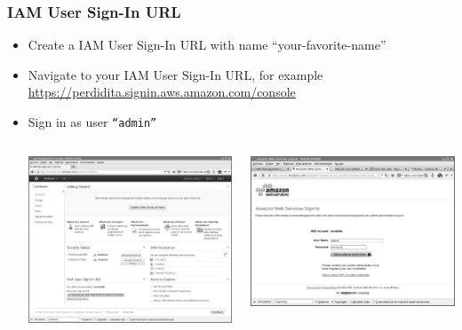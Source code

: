 \documentclass{beamer}
\begin{document}
\begin{frame}[fragile]
\frametitle{IAM User Sign-In URL}
\begin{itemize}
\item Create a IAM User Sign-In URL with name ``your-favorite-name''
\item Navigate to your IAM User Sign-In URL, for example \url{https://perdidita.signin.aws.amazon.com/console}
\item Sign in as user \texttt{``admin''}
\begin{columns}
\begin{center}
\includegraphics[scale=0.10]{siginurl.eps}
\end{center}
\begin{center}
\includegraphics[scale=0.10]{siginurl1.eps}
\end{center}
\end{columns}
\end{itemize}
\end{frame}
\end{document}
